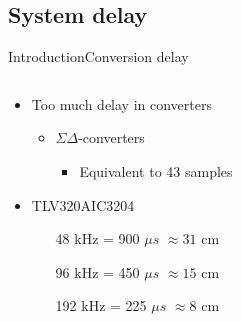 \subsection{System delay}
\begin{frame}{Introduction}{Conversion delay}
	\begin{columns}
		\begin{column}{0.4\textwidth}
		\begin{itemize}
		\item Too much delay in converters
				\begin{itemize}
				\item $\Sigma \Delta$-converters
				\begin{itemize}
				\item Equivalent to 43 samples
				\end{itemize}								
				\end{itemize}
		\item TLV320AIC3204
				\begin{itemize}
				\item[\textcolor{MATLABred}{48 kHz}]= 900 $\mu s$ $\approx 31$ cm
				\item[\textcolor{MATLAByellow}{96 kHz}]= 450 $\mu s$ $\approx 15$ cm
				\item[\textcolor{MATLABpurple}{192 kHz}]= 225 $\mu s$ $\approx 8$ cm
				\end{itemize}	
		\end{itemize}
		\end{column}
		\begin{column}{0.6\textwidth} 
		\begin{center}
		
		\end{center}
		\end{column}
	\end{columns}
\end{frame}

